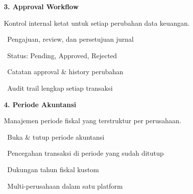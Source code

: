\documentclass[a4paper]{article}
\begin{document}
\noindent
\begin{minipage}[t]{0.485\textwidth}
    \colorbox{EmeraldDark}{%
        \begin{minipage}{\dimexpr\textwidth-2\fboxsep\relax}
            {\fontsize{10}{13}\selectfont\bfseries\color{White} 3. Approval Workflow}
        \end{minipage}}\par
    \vspace{4pt}
    {\fontsize{9}{12}\selectfont\color{TextDark}%
    Kontrol internal ketat untuk setiap perubahan data keuangan.\par\vspace{3pt}
    \textbullet\ Pengajuan, review, dan persetujuan jurnal\par\vspace{2pt}%
    \textbullet\ Status: Pending, Approved, Rejected\par\vspace{2pt}%
    \textbullet\ Catatan approval \& history perubahan\par\vspace{2pt}%
    \textbullet\ Audit trail lengkap setiap transaksi}%
\end{minipage}%
\hfill
\begin{minipage}[t]{0.485\textwidth}
    \colorbox{PurplePrimary}{%
        \begin{minipage}{\dimexpr\textwidth-2\fboxsep\relax}
            {\fontsize{10}{13}\selectfont\bfseries\color{White} 4. Periode Akuntansi}
        \end{minipage}}\par
    \vspace{4pt}
    {\fontsize{9}{12}\selectfont\color{TextDark}%
    Manajemen periode fiskal yang terstruktur per perusahaan.\par\vspace{3pt}
    \textbullet\ Buka \& tutup periode akuntansi\par\vspace{2pt}%
    \textbullet\ Pencegahan transaksi di periode yang sudah ditutup\par\vspace{2pt}%
    \textbullet\ Dukungan tahun fiskal kustom\par\vspace{2pt}%
    \textbullet\ Multi-perusahaan dalam satu platform}%
\end{minipage}

\vspace{8pt}
\end{document}

